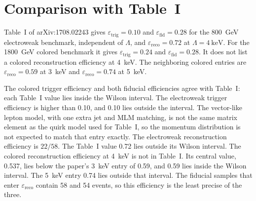 \documentclass[11pt,a4paper]{article}
\begin{document}
\section{Comparison with Table~I}
Table~I of arXiv:1708.02243 gives \(\varepsilon_{\mathrm{trig}} = 0.10\) and \(\varepsilon_{\mathrm{fid}} = 0.28\) for the \SI{800}{\GeV} electroweak benchmark, independent of \(\Lambda\), and \(\varepsilon_{\mathrm{reco}} = 0.72\) at \(\Lambda = \SI{4}{\keV}\).
For the \SI{1800}{\GeV} colored benchmark it gives \(\varepsilon_{\mathrm{trig}} = 0.24\) and \(\varepsilon_{\mathrm{fid}} = 0.28\).
It does not list a colored reconstruction efficiency at \SI{4}{\keV}.
The neighboring colored entries are \(\varepsilon_{\mathrm{reco}} = 0.59\) at \SI{3}{\keV} and \(\varepsilon_{\mathrm{reco}} = 0.74\) at \SI{5}{\keV}.

\begin{table}[H]
\centering
\caption{Table~I compared with the MadGraph samples. A Table~I value is marked outside when it does not lie in the Wilson 95\% interval.}
\label{tab:compare}
\footnotesize
{}
\end{table}

The colored trigger efficiency and both fiducial efficiencies agree with Table~I: each Table~I value lies inside the Wilson interval.
The electroweak trigger efficiency is higher than 0.10, and 0.10 lies outside the interval.
The vector-like lepton model, with one extra jet and MLM matching, is not the same matrix element as the quirk model used for Table~I, so the momentum distribution is not expected to match that entry exactly.
The electroweak reconstruction efficiency is \(22/58\).
The Table~I value 0.72 lies outside its Wilson interval.
The colored reconstruction efficiency at \SI{4}{\keV} is not in Table~I.
Its central value, 0.537, lies below the paper's \SI{3}{\keV} entry of 0.59, and 0.59 lies inside the Wilson interval.
The \SI{5}{\keV} entry 0.74 lies outside that interval.
The fiducial samples that enter \(\varepsilon_{\mathrm{reco}}\) contain 58 and 54 events, so this efficiency is the least precise of the three.
\end{document}

